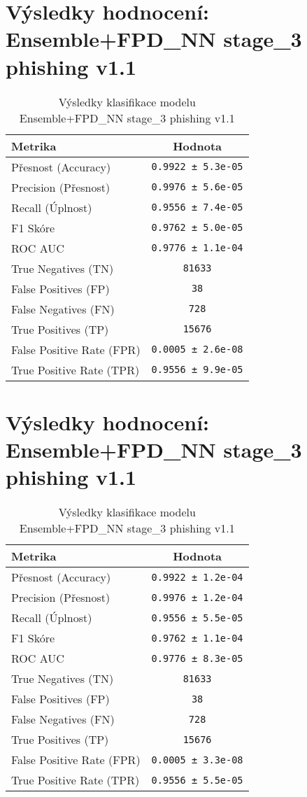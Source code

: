\section*{Výsledky hodnocení: Ensemble+FPD_NN stage_3 phishing v1.1}
\begin{table}[h!]
\centering
\begin{tabular}{|l|c|}
\hline
\textbf{Metrika} & \textbf{Hodnota} \\
\hline
Přesnost (Accuracy) & \texttt{0.9922 ± 5.3e-05} \\
Precision (Přesnost) & \texttt{0.9976 ± 5.6e-05} \\
Recall (Úplnost) & \texttt{0.9556 ± 7.4e-05} \\
F1 Skóre & \texttt{0.9762 ± 5.0e-05} \\
ROC AUC & \texttt{0.9776 ± 1.1e-04} \\
True Negatives (TN) & \texttt{81633} \\
False Positives (FP) & \texttt{38} \\
False Negatives (FN) & \texttt{728} \\
True Positives (TP) & \texttt{15676} \\
False Positive Rate (FPR) & \texttt{0.0005 ± 2.6e-08} \\
True Positive Rate (TPR) & \texttt{0.9556 ± 9.9e-05} \\
\hline
\end{tabular}
\caption{Výsledky klasifikace modelu Ensemble+FPD_NN stage_3 phishing v1.1}
\label{tab:phishing_ensemble+fpd_nn}
\end{table}

\section*{Výsledky hodnocení: Ensemble+FPD_NN stage_3 phishing v1.1}
\begin{table}[h!]
\centering
\begin{tabular}{|l|c|}
\hline
\textbf{Metrika} & \textbf{Hodnota} \\
\hline
Přesnost (Accuracy) & \texttt{0.9922 ± 1.2e-04} \\
Precision (Přesnost) & \texttt{0.9976 ± 1.2e-04} \\
Recall (Úplnost) & \texttt{0.9556 ± 5.5e-05} \\
F1 Skóre & \texttt{0.9762 ± 1.1e-04} \\
ROC AUC & \texttt{0.9776 ± 8.3e-05} \\
True Negatives (TN) & \texttt{81633} \\
False Positives (FP) & \texttt{38} \\
False Negatives (FN) & \texttt{728} \\
True Positives (TP) & \texttt{15676} \\
False Positive Rate (FPR) & \texttt{0.0005 ± 3.3e-08} \\
True Positive Rate (TPR) & \texttt{0.9556 ± 5.5e-05} \\
\hline
\end{tabular}
\caption{Výsledky klasifikace modelu Ensemble+FPD_NN stage_3 phishing v1.1}
\label{tab:phishing_ensemble+fpd_nn}
\end{table}

